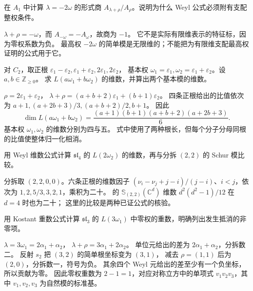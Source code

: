 \begin{exercise}\label{b5:ex:19-negative-formal-quotient}
	在 \(A_1\) 中计算 \(\lambda=-2\omega\) 的形式商 \(A_{\lambda+\rho}/A_\rho\)。说明为什么 Weyl 公式必须附有支配整权条件。
\end{exercise}
\begin{solution}
	\(\lambda+\rho=-\omega\)，而 \(A_{-\omega}=-A_\omega\)，故商为 \(-1\)。 它不是实际有限维表示的特征标，因为零权系数为负。 最高权 \(-2\omega\) 的简单模是无限维的；不能把为有限维支配最高权证明的公式用于它。
\end{solution}

\begin{exercise}\label{b5:ex:19-c2-dimension}
	对 \(C_2\)，取正根 \(\varepsilon_1-\varepsilon_2,\varepsilon_1+\varepsilon_2,2\varepsilon_1,2\varepsilon_2\)， 基本权 \(\omega_1=\varepsilon_1,\omega_2=\varepsilon_1+\varepsilon_2\)。设 \(a,b\in\mathbb Z_{\ge0}\)。 求 \(L(a\omega_1+b\omega_2)\) 的维数，并算出两个基本模的维数。
\end{exercise}
\begin{solution}
	\(\rho=2\varepsilon_1+\varepsilon_2\)， \(\lambda+\rho=(a+b+2)\varepsilon_1+(b+1)\varepsilon_2\)。 四条正根给出的比值依次为 \(a+1,(a+2b+3)/3,(a+b+2)/2,b+1\)。 因此
	\[
		\dim L(a\omega_1+b\omega_2) =\frac{(a+1)(b+1)(a+b+2)(a+2b+3)}6.
	\]
	基本权 \(\omega_1,\omega_2\) 的维数分别为四与五。 式中使用了两种根长，但每个分子分母同根的比值使整体归一化相消。
\end{solution}

\begin{exercise}\label{b5:ex:19-a3-middle-weight}
	用 Weyl 维数公式计算 \(\mathfrak{sl}_4\) 的 \(L(2\omega_2)\) 的维数，再与分拆 \((2,2)\) 的 Schur 模比较。
\end{exercise}
\begin{solution}
	分拆取 \((2,2,0,0)\)。六条正根的维数因子 \((\nu_i-\nu_j+j-i)/(j-i)\)、\(i<j\)，依次为 \(1,2,5/3,3,2,1\)，乘积为二十。 的 \(\mathbb S_{(2,2)}(\mathbb C^d)\) 维数 \(d^2(d^2-1)/12\) 在 \(d=4\) 时也为二十； 这里的比较是两种已证公式的核验。
\end{solution}

\begin{exercise}\label{b5:ex:19-kostant-cancellation}
	用 Kostant 重数公式计算 \(\mathfrak{sl}_3\) 的 \(L(3\omega_1)\) 中零权的重数，明确列出发生抵消的非零项。
\end{exercise}
\begin{solution}
	\(\lambda=3\omega_1=2\alpha_1+\alpha_2\)， \(\lambda+\rho=3\alpha_1+2\alpha_2\)。 单位元给出的差为 \(2\alpha_1+\alpha_2\)，分拆数二。 反射 \(s_2\) 把 \((3,2)\) 的简单根坐标变为 \((3,1)\)， 减去 \(\rho=(1,1)\) 后为 \((2,0)\)，分拆数一，符号为负。 其余四个 Weyl 元给出的差至少有一个负坐标，所以贡献为零。 因此零权重数为 \(2-1=1\)，对应对称立方中的单项式 \(v_1v_2v_3\)，其中 \(v_1,v_2,v_3\) 为自然模的标准基。
\end{solution}

